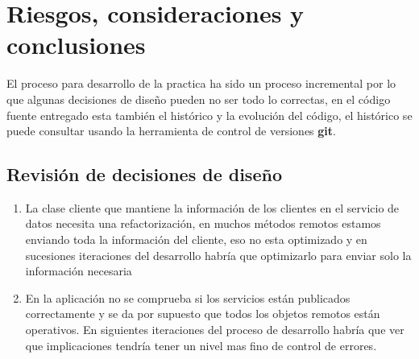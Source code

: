 \chapter{Riesgos, consideraciones y conclusiones}

El proceso para desarrollo de la practica ha sido un proceso incremental por lo que algunas decisiones de diseño pueden no ser todo lo correctas, en el código fuente entregado esta también el histórico y la evolución del código, el histórico se puede consultar usando la herramienta de control de versiones \textbf{git}.

\section{Revisión de decisiones de diseño}

\begin{enumerate}\label{sec:consideraciones_datos}
	\item La clase cliente que mantiene la información de los clientes en el servicio de datos necesita una refactorización, en muchos métodos remotos estamos enviando toda la información del cliente, eso no esta optimizado y en sucesiones iteraciones del desarrollo habría que optimizarlo para enviar solo la información necesaria
	\item En la aplicación no se comprueba si los servicios están publicados correctamente y se da por supuesto que todos los objetos remotos están operativos. En siguientes iteraciones del proceso de desarrollo habría que ver que implicaciones tendría tener un nivel mas fino de control de errores.
\end{enumerate}
